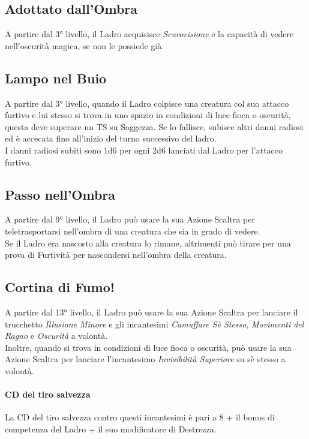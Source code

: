 \subsection{Adottato dall'Ombra}

A partire dal 3° livello, il Ladro acquisisce \textit{Scurovisione} e la capacità di vedere nell'oscurità magica, se non le possiede già.

\subsection{Lampo nel Buio}

A partire dal 3° livello, quando il Ladro colpisce una creatura col suo attacco furtivo e lui stesso si trova in uno spazio in condizioni di luce fioca o oscurità, questa deve superare un TS su Saggezza. Se lo fallisce, subisce altri danni radiosi ed è accecata fino all'inizio del turno successivo del ladro. \\ I danni radiosi subiti sono 1d6 per ogni 2d6 lanciati dal Ladro per l'attacco furtivo.

\subsection{Passo nell'Ombra}

A partire dal 9° livello, il Ladro può usare la sua Azione Scaltra per teletrasportarsi nell'ombra di una creatura che sia in grado di vedere. \\ Se il Ladro era nascosto alla creatura lo rimane, altrimenti può tirare per una prova di Furtività per nascondersi nell'ombra della creatura.

\subsection{Cortina di Fumo!}

A partire dal 13° livello, il Ladro può usare la sua Azione Scaltra per lanciare il trucchetto \textit{Illusione Minore} e gli incantesimi \textit{Camuffare Sè Stesso}, \textit{Movimenti del Ragno} e \textit{Oscurità} a volontà. \\ Inoltre, quando si trova in condizioni di luce fioca o oscurità, può usare la sua Azione Scaltra per lanciare l'incantesimo \textit{Invisibilità Superiore} su sè stesso a volontà.
\paragraph{CD del tiro salvezza}La CD del tiro salvezza contro questi incantesimi è pari a 8 + il bonus di competenza del Ladro + il suo modificatore di Destrezza.

